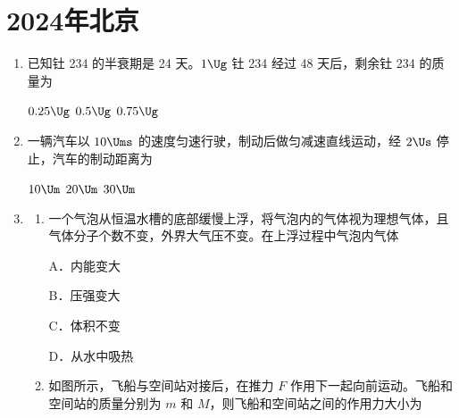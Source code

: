 \documentclass[\gkver]{gaokaozhenti}
\begin{document}
\chapter{2024年北京}

\begin{enumerate}
\item
已知钍 234 的半衰期是 24 天。$1 \Ug$ 钍 234 经过 48 天后，剩余钍 234 的质量为

\fourchoices[answer=B]
{$0 \Ug$}
{$0.25 \Ug$}
{$0.5 \Ug$}
{$0.75 \Ug$}


\item
一辆汽车以 $10 \Ums$ 的速度匀速行驶，制动后做匀减速直线运动，经 $2 \Us$ 停止，汽车的制动距离为

\fourchoices[answer=B]
{$5 \Um$}
{$10 \Um$}
{$20 \Um$}
{$30 \Um$}


\item
\begin{enumerate}
	\item
	一个气泡从恒温水槽的底部缓慢上浮，将气泡内的气体视为理想气体，且气体分子个数不变，外界大气压不变。在上浮过程中气泡内气体

	A．内能变大

	B．压强变大

	C．体积不变

	D．从水中吸热
	\item
	如图所示，飞船与空间站对接后，在推力 $F$ 作用下一起向前运动。飞船和空间站的质量分别为 $m$ 和 $M$，则飞船和空间站之间的作用力大小为


\end{enumerate}
\end{enumerate}
\end{document}
